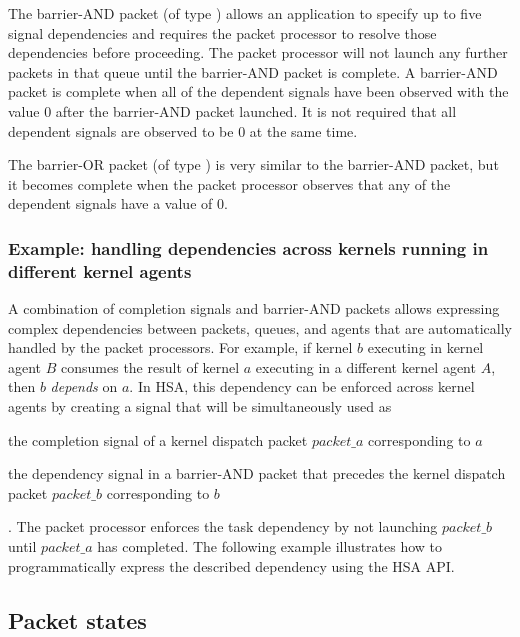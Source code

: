 \documentclass[final,oneside]{book}
\begin{document}
The barrier-AND packet (of type ) allows an
application to specify up to five signal dependencies and requires the packet
processor to resolve those dependencies before proceeding. The packet processor
will not launch any further packets in that queue until the barrier-AND packet
is complete. A barrier-AND packet is complete when all of the dependent signals
have been observed with the value 0 after the barrier-AND packet launched. It is
not required that all dependent signals are observed to be 0 at the same time.

The barrier-OR packet (of type ) is very similar
to the barrier-AND packet, but it becomes complete when the packet processor
observes that any of the dependent signals have a value of 0.

\subsubsection{Example: handling dependencies across kernels running in
  different kernel agents}
A combination of completion signals and barrier-AND packets allows expressing
complex dependencies between packets, queues, and agents that are
automatically handled by the packet processors. For example, if kernel $b$
executing in kernel agent $B$ consumes the result of kernel $a$ executing in a
different kernel agent $A$, then $b$ \textit{depends} on $a$. In HSA, this
dependency can be enforced across kernel agents by creating a signal that will
be simultaneously used as \begin{inparaenum}[1\upshape)] \item the completion
  signal of a kernel dispatch packet $packet\_a$ corresponding to $a$ \item the
  dependency signal in a barrier-AND packet that precedes the kernel dispatch
  packet $packet\_b$ corresponding to $b$\end{inparaenum}. The packet processor
enforces the task dependency by not launching $packet\_b$ until $packet\_a$ has
completed. The following example illustrates how to programmatically express the
described dependency using the HSA API.

\subsection{Packet states}\label{packet-states}
\end{document}
